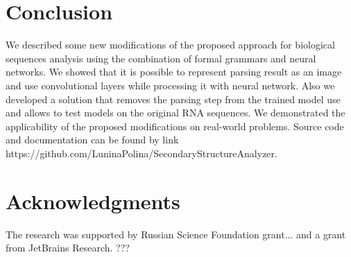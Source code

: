 \documentclass[12pt,a4paper]{cibb}
\begin{document}
\section{\bf Conclusion}
We described some new modifications of the proposed approach for biological sequences analysis using the combination of formal grammars and neural networks. We showed that it is possible to represent parsing result as an image and use convolutional layers while processing it with neural network. Also we developed a solution that removes the parsing step from the trained model use and allows to test models on the original RNA sequences. We demonstrated the applicability of the proposed modifications on real-world problems. Source code and documentation can be found by link https://github.com/LuninaPolina/SecondaryStructureAnalyzer.

\section*{\bf Acknowledgments}
The research was supported by Russian Science Foundation grant... and a grant from JetBrains Research. ???



%


{\fontsize{10}{10}\selectfont
\setlength{\parskip}{0pt}



}
\end{document}
